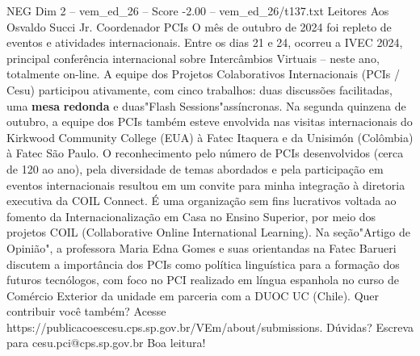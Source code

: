 \begin{textsample}{NEG Dim 2 – vem\_ed\_26 – Score -2.00 – vem\_ed\_26/t137.txt}  \label{ex:f2_neg_036}
Leitores Aos Osvaldo Succi Jr.
Coordenador PCIs O mês de outubro de 2024 foi repleto de eventos e atividades internacionais.
Entre os dias 21 e 24, ocorreu a IVEC 2024, principal conferência internacional sobre Intercâmbios Virtuais – neste ano, totalmente on-line.
A equipe dos Projetos Colaborativos Internacionais (PCIs / Cesu) participou ativamente, com cinco trabalhos: duas discussões facilitadas, uma \textbf{mesa} \textbf{redonda} e duas"Flash Sessions"assíncronas.
Na segunda quinzena de outubro, a equipe dos PCIs também esteve envolvida nas visitas internacionais do Kirkwood Community College (EUA) à Fatec Itaquera e da Unisimón (Colômbia) à Fatec São Paulo.
O reconhecimento pelo número de PCIs desenvolvidos (cerca de 120 ao ano), pela diversidade de temas abordados e pela participação em eventos internacionais resultou em um convite para minha integração à diretoria executiva da COIL Connect.
É uma organização sem fins lucrativos voltada ao fomento da Internacionalização em Casa no Ensino Superior, por meio dos projetos COIL (Collaborative Online International Learning).
Na seção"Artigo de Opinião", a professora Maria Edna Gomes e suas orientandas na Fatec Barueri discutem a importância dos PCIs como política linguística para a formação dos futuros tecnólogos, com foco no PCI realizado em língua espanhola no curso de Comércio Exterior da unidade em parceria com a DUOC UC (Chile).
Quer contribuir você também?
Acesse https://publicacoescesu.cps.sp.gov.br/VEm/about/submissions.
Dúvidas?
Escreva para cesu.pci@cps.sp.gov.br Boa leitura!

\end{textsample}
